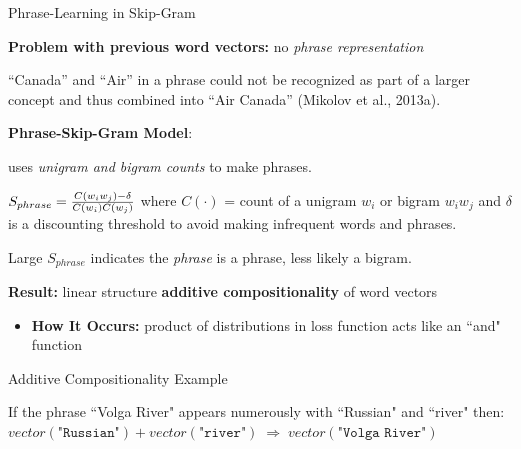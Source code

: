 \begin{frame}{Phrase-Learning in Skip-Gram}

    \begin{itemizeSpaced}{7pt}
    
        \pinkbox \textbf{Problem with previous word vectors:} no \emph{phrase representation}
        \begin{itemize}
            \arrowitem “Canada” and “Air” in a phrase could not be recognized as part of a larger concept and thus combined into “Air Canada” (Mikolov et al., 2013a).
        \end{itemize}
        
        \pinkbox \textbf{Phrase-Skip-Gram Model}:
        \begin{itemizeSpaced}{2pt}
            \pinkbox uses \emph{unigram and bigram counts} to make phrases.
            
            \item ${\large S_{phrase} = \frac{C(w_i w_j) - \delta} {C(w_i)C(w_j)} }$ where $C(\cdot)$ = count of a unigram $w_i$ or bigram $w_i w_j$ and $\delta$ is a discounting threshold to avoid making infrequent words and phrases.
            
            \item Large $S_{phrase}$ indicates the \emph{phrase} is a phrase, less likely a bigram. 
        \end{itemizeSpaced}
        
        
        \item \textbf{Result: } linear structure \textbf{additive compositionality} of word vectors 
        
        \begin{itemize}
            \pinkbox \textbf{Explaining Additive Compositionality: }lets some individual words be combined into phrase and viewed as unique identity, while a bigram like “this is” should remain unchanged (Mikolov et al., 2013a, p. 5).
            
            \item \textbf{How It Occurs: } product of distributions in loss function acts like an ``and" function
        \end{itemize} 
        
        \begin{exampleBlock}{Additive Compositionality Example}
        
        If the phrase ``Volga River" appears numerously with ``Russian" and ``river" then: $vector(\texttt{"Russian"}) \! + \! vector(\texttt{"river"}) \; \Rightarrow \; vector(\texttt{"Volga River"})$
        
        \end{exampleBlock}
        
        
    \end{itemizeSpaced}
    
\end{frame}
